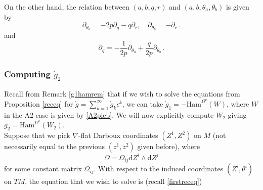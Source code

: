 \documentclass{article}
\theoremstyle{definition}
\numberwithin{equation}{section}
\begin{document}
On the other hand, the relation between $(a,b,q,r)$ and $(a,b,\theta_a,\theta_b)$ is given by
\begin{equation}\label{usefulid}
    \partial_{\theta_a}=-2p\partial_{q}-q\partial_r, \quad \partial_{\theta_b}=-\partial_r\,.
\end{equation}
and 
\begin{equation}\label{usefulid2}
    \partial_q=-\frac{1}{2p}\partial_{\theta_a}+\frac{q}{2p}\partial_{\theta_b}\,.
\end{equation}






\subsubsection{Computing $\dot{g}_2$}

Recall from Remark \ref{g1hamrem}  that if we wish to solve the equations from Proposition \ref{receq} for $\dot{g}=\sum_{k=1}^{\infty}\dot{g}_k\epsilon^k$, we can take $\dot{g}_1=-\text{Ham}^{\Omega^{v}}(W)$, where $W$ in the A2 case is given by \eqref{A2pleb}. We will now explicitly compute $W_2$ giving $g_2=\text{Ham}^{\Omega^{v}}({W_2})$.\\

Suppose that we pick $\nabla$-flat Darboux coordinates $(Z^1,Z^2)$ on $M$ (not necessarily equal to the previous $(z^1,z^2)$ given before), where
\begin{equation*}
\Omega=\Omega_{ij}\mathrm{d}Z^i\wedge \mathrm{d}Z^j
\end{equation*}
for some constant matrix $\Omega_{ij}$. With respect to the induced coordinates $(Z^i,\theta^i)$ on $TM$, the equation that we wish to solve is (recall \eqref{firstreceq}) 
\end{document}
